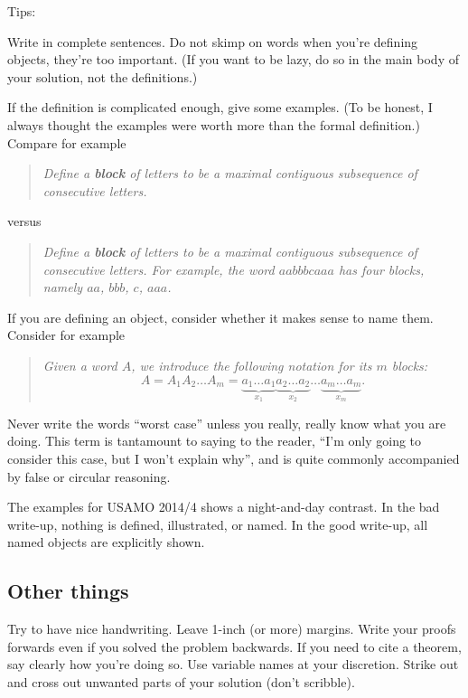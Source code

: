 \documentclass[11pt]{scrartcl}
\begin{document}
Tips:
\begin{itemize}
  \ii \alert{Write in complete sentences}.
  Do not skimp on words when you're defining objects, they're too important.
  (If you want to be lazy, do so in the main body of your solution, not the definitions.)

  \ii If the definition is complicated enough, \alert{give some examples}.
  (To be honest, I always thought the examples were worth more than the formal definition.)
  Compare for example
  \begin{quote}
  \slshape
  Define a \textbf{block} of letters to be a maximal
  contiguous subsequence of consecutive letters.
  \end{quote}
  versus
  \begin{quote}
  \slshape
  Define a \textbf{block} of letters to be a maximal
  contiguous subsequence of consecutive letters.
  For example, the word $aabbbcaaa$ has four blocks, namely $aa$, $bbb$, $c$, $aaa$.
  \end{quote}

  \ii If you are defining an object, consider whether it makes sense to name them.
  Consider for example
  \begin{quote}
  \slshape
  Given a word $A$, we introduce the following notation for its $m$ blocks:
  \[ A =
    A_1 A_2 \dots A_m
    = \underbrace{a_1 \dots a_1}_{x_1}
    \underbrace{a_2 \dots a_2}_{x_2}
    \dots
    \underbrace{a_m \dots a_m}_{x_m}.
  \]
  \end{quote}

  \ii \alert{Never write the words ``worst case''} unless you really,
  really know what you are doing.
  This term is tantamount to saying to the reader,
  ``I'm only going to consider this case, but I won't explain why'',
  and is quite commonly accompanied by false or circular reasoning.
\end{itemize}
The examples for USAMO 2014/4 shows a night-and-day contrast.
In the bad write-up, nothing is defined, illustrated, or named.
In the good write-up, all named objects are explicitly shown.

\subsection{Other things}
Try to have nice handwriting.
Leave 1-inch (or more) margins.
Write your proofs forwards even if you solved the problem backwards.
If you need to cite a theorem, say clearly how you're doing so.
Use variable names at your discretion.
Strike out and cross out unwanted parts of your solution (don't scribble).
\end{document}

